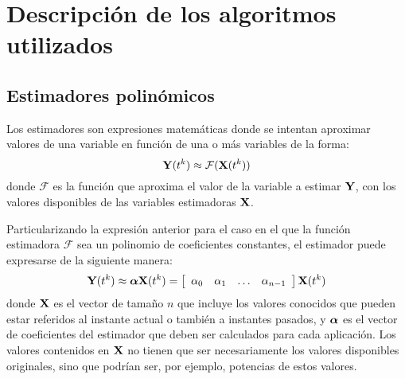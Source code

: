 
\section{Descripción de los algoritmos utilizados}
\label{ch:algoritmos}



\subsection{Estimadores polinómicos}

Los estimadores son expresiones matemáticas donde se intentan aproximar valores de una variable en función de una o más variables de la forma:
%
\begin{equation}
    \estimated (t^k) \approx \mathcal{F}(\estimation (t^k))
\end{equation}
%
donde $\mathcal{F}$ es la función que aproxima el valor de la variable a estimar $\estimated$, con los valores disponibles de las variables estimadoras $\estimation$.

Particularizando la expresión anterior para el caso en el que la función estimadora $\mathcal{F}$ sea un polinomio de coeficientes constantes, el estimador puede expresarse de la siguiente manera:
%
\begin{equation}
    \estimated (t^k) \approx \coefficients \estimation (t^k) = \sqbr{\hvect{cccc}{\coefficient_0 & \coefficient_1 & \hdots & \coefficient_{n-1}}} \estimation (t^k)
\end{equation}
%
donde $\estimation$ es el vector de tamaño $n$ que incluye los valores conocidos que pueden estar referidos al instante actual o también a instantes pasados, y $\coefficients$ es el vector de coeficientes del estimador que deben ser calculados para cada aplicación. Los valores contenidos en $\estimation$ no tienen que ser necesariamente los valores disponibles originales, sino que podrían ser, por ejemplo, potencias de estos valores.

